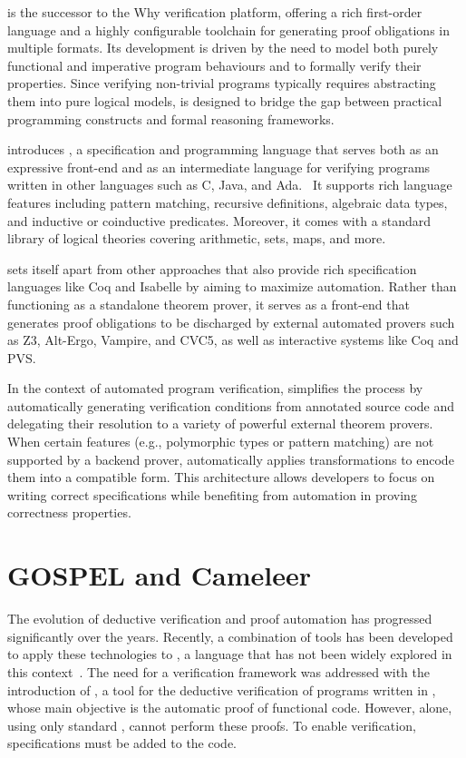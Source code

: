 \whythree is the successor to the Why verification platform, offering a rich first-order language and a highly configurable 
toolchain for generating proof obligations in multiple formats. Its development is driven by the need to model both purely 
functional and imperative program behaviours and to formally verify their properties. Since verifying non-trivial programs 
typically requires abstracting them into pure logical models, \whythree is designed to bridge the gap between practical programming 
constructs and formal reasoning frameworks.

\whythree introduces \whyml, a specification and programming language that serves both as an expressive front-end and as 
an intermediate language for verifying programs written in other languages such as C, Java, and Ada.~\cite{FilliatreP13} 
It supports rich language features including pattern matching, recursive definitions, algebraic data types, and inductive or 
coinductive predicates. Moreover, it comes with a standard library of logical theories covering arithmetic, sets, maps, 
and more.

\whythree sets itself apart from other approaches that also provide rich specification languages like \textsf{Coq} and 
\textsf{Isabelle} by aiming to maximize automation. Rather than functioning as a standalone theorem prover, it serves 
as a front-end that generates proof obligations to be discharged by external automated provers such as Z3, Alt-Ergo, 
Vampire, and CVC5, as well as interactive systems like Coq and PVS.

In the context of automated program verification, \whythree simplifies the process by automatically generating verification 
conditions from annotated source code and delegating their resolution to a variety of powerful external theorem provers. 
When certain features (e.g., polymorphic types or pattern matching) are not supported by a backend prover, \whythree automatically 
applies transformations to encode them into a compatible form. This architecture allows developers to focus on writing 
correct specifications while benefiting from automation in proving correctness properties.~\cite{boogie11why3}

\section{GOSPEL and Cameleer}
\label{sec:Cameleer}

The evolution of deductive verification and proof automation has progressed significantly over the years. Recently, a 
combination of tools has been developed to apply these technologies to \ocaml, a language that has not been widely explored in 
this context~\cite{PereiraR20}. The need for a verification framework was addressed with the introduction of \cameleer, a tool 
for the deductive verification of programs written in \ocaml, whose main objective is the automatic proof of functional code. 
However, \cameleer alone, using only standard \ocaml, cannot perform these proofs. To enable verification, \gospel specifications 
must be added to the \ocaml code.

